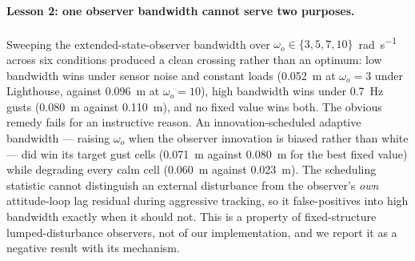 \paragraph{Lesson 2: one observer bandwidth cannot serve two purposes.}
Sweeping the extended-state-observer bandwidth over
$\omega_o \in \{3,5,7,10\}$~\si{\radian\per\second} across six conditions produced a
clean crossing rather than an optimum: low bandwidth wins under sensor noise and
constant loads (\SI{0.052}{\meter} at $\omega_o=3$ under Lighthouse, against
\SI{0.096}{\meter} at $\omega_o=10$), high bandwidth wins under \SI{0.7}{\hertz} gusts
(\SI{0.080}{\meter} against \SI{0.110}{\meter}), and no fixed value wins both. The
obvious remedy fails for an instructive reason. An innovation-scheduled adaptive
bandwidth --- raising $\omega_o$ when the observer innovation is biased rather than
white --- did win its target gust cells (\SI{0.071}{\meter} against \SI{0.080}{\meter}
for the best fixed value) while degrading every calm cell (\SI{0.060}{\meter} against
\SI{0.023}{\meter}). The
scheduling statistic cannot distinguish an external
disturbance from the observer's \emph{own} attitude-loop lag residual during aggressive
tracking, so it false-positives into high bandwidth exactly when it should not. This is
a property of fixed-structure lumped-disturbance observers, not of our implementation,
and we report it as a negative result with its mechanism.

